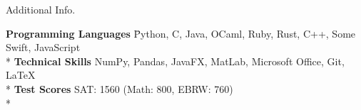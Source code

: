 \documentclass{article}
\newlength{\tabin}
\newlength{\secsep}
\newcommand{\lineunder}{\vspace*{-8pt} \\ \hspace*{-6pt} \hrulefill \\ \vspace*{-15pt}}
\newenvironment{tabbedsection}[1]{
  \begin{list}{}{
      \setlength{\itemsep}{0pt}
      \setlength{\labelsep}{0pt}
      \setlength{\labelwidth}{0pt}
      \setlength{\leftmargin}{\tabin}
      \setlength{\rightmargin}{\tabin}
      \setlength{\listparindent}{0pt}
      \setlength{\parsep}{0pt}
      \setlength{\parskip}{0pt}
      \setlength{\partopsep}{0pt}
      \setlength{\topsep}{#1}
    }
  \item[]
}{\end{list}}
\newenvironment{nospacetabbing}{
    \begin{tabbing}
}{\end{tabbing}\vspace{-1.2em}}
\newenvironment{resume_section}[1]{
  \filbreak
  \vspace{2\secsep}
  \textsc{\large#1}
  \lineunder
  \begin{tabbedsection}{\secsep}
}{\end{tabbedsection}}
\begin{document}
\begin{resume_section}{Additional Info.}
  \begin{nospacetabbing}
  \textbf{Programming Languages} \= Python, C, Java, OCaml, Ruby, Rust, C++, Some Swift, JavaScript\\*
  \textbf{Technical Skills}  \> NumPy, Pandas, JavaFX, MatLab, Microsoft Office, Git, \LaTeX \\ *
  \textbf{Test Scores} \> SAT: 1560 (Math: 800, EBRW: 760)\\*

  \end{nospacetabbing}
\end{resume_section}
\end{document}
